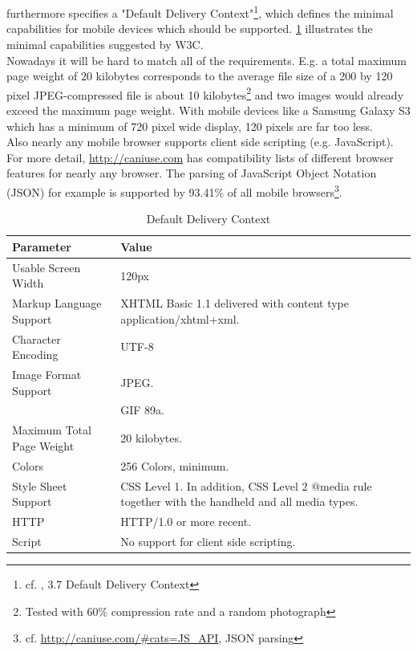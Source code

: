 \\
\\
\cite{WorldWideWebConsortium.2008} furthermore specifies a "Default Delivery Context"\footnote{cf. \cite{WorldWideWebConsortium.2008}, 3.7 Default Delivery Context}, which defines the minimal capabilities for mobile devices which should be supported. \ref{tab:DefaultDeliveryContext} illustrates the minimal capabilities suggested by W3C.
\\
Nowadays it will be hard to match all of the requirements. E.g. a total maximum page weight of 20 kilobytes corresponds to the average file size of a 200 by 120 pixel JPEG-compressed file is about 10 kilobytes\footnote{Tested with 60\% compression rate and a random photograph} and two images would already exceed the maximum page weight. With mobile devices like a Samsung Galaxy S3 which has a minimum of 720 pixel wide display, 120 pixels are far too less.
\\
Also nearly any mobile browser supports client side scripting (e.g. JavaScript). For more detail, \url{http://caniuse.com} has compatibility lists of different browser features for nearly any browser. The parsing of JavaScript Object Notation (JSON) for example is supported by 93.41\% of all mobile browsers\footnote{cf. \url{http://caniuse.com/\#cats=JS_API}, JSON parsing}.
\begin{table}[!tb]
    \center
    \begin{tabular}{l | p{21.5em}}
        \textbf{Parameter} & \textbf{Value} \\
        \hline
        Usable Screen Width & 120px \\
        \hline
        Markup Language Support & XHTML Basic 1.1 delivered with content type application/xhtml+xml. \\
        \hline
        Character Encoding & UTF-8 \\
        \hline
        Image Format Support & JPEG. \\
        & GIF 89a. \\
        \hline
        Maximum Total Page Weight & 20 kilobytes. \\
        \hline
        Colors & 256 Colors, minimum. \\
        \hline
        Style Sheet Support & CSS Level 1. In addition, CSS Level 2 @media rule together with the handheld and all media types. \\
        \hline
        HTTP & HTTP/1.0 or more recent. \\
        \hline
        Script & No support for client side scripting. \\
    \end{tabular}
    \caption[Mobile Default Delivery Context]{Default Delivery Context\footnotemark}
    \label{tab:DefaultDeliveryContext}
\end{table}
